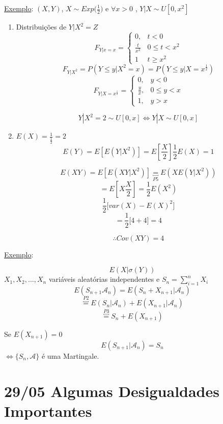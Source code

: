 \documentclass[a4paper,12pt]{article}
\begin{document}
\newpage 


\underline{Exemplo}:
$(X,Y)$,  $X\sim Exp\bigg(\frac{1}{2}\bigg)$ e $\forall x>0$ , $Y|X \sim U[0,x^2]$  

\begin{enumerate}[label=\alph*)]
	\item Distribuições de $Y|X^2=Z$
	$$ 
	F_{Y|x=x}=\begin{cases}
	0, & t<0\\
	\frac{t}{x^2} & 0\le t < x^2\\
	1 & t\ge x^2
	\end{cases}
	$$
	$$F_{Y|X^2} = P(Y\le y| X^2=x)=P(Y\le y|X=x^\frac{1}{2})$$
	$$F_{Y|X=x^\frac{1}{2}}= \begin{cases}
	0, & y<0\\
	\frac{y}{x}, & 0\le y < x\\
	1, & y>x
	\end{cases}
	 $$
	
	 $$Y|X^2=2 \sim  U[0,x] \Leftrightarrow Y|X \sim U[0,x]$$


\item $E(X) = \frac{1}{\frac{1}{2}}=2$
$$E(Y) = E[E(Y|X^2)] = E[\frac{X}{2}] \frac{1}{2}E(X)=1$$

$$E(XY)= E[E(XY|X^2)] \underbracket{=}_{P5} E(XE(Y|X^2))$$
$$=E[X\frac{X}{2}] = \frac{1}{2}E(X^2) $$
$$\frac{1}{2} \bigg[var(X) - E(X)^2 \bigg] $$
$$=\frac{1}{2}\bigg[4+4\bigg]=4 $$

$$\therefore Cov(XY)=4 $$

\end{enumerate}

\newpage 

\underline{Exemplo}:

$$E(X|\sigma(Y)) $$
$X_1,X_2,\ldots,X_n $  variáveis aleatórias independentes e $S_n = \sum\limits_{i=1}^{n}X_i$
$$E(S_{n+1} \mathscr A_n)  = E(S_n+X_{n+1}|\mathscr A_n) $$
$$\overbracket{=}^{P2} E(S_n|\mathscr A_n) + E(X_{n+1}|\mathscr A_n) $$ 
$$\overbracket{=}^{P3}S_n + E(X_{n+1}) $$

Se $E(X_{n+1})=0$
$$E(S_{n+1}|\mathscr A_n) = S_n $$
$\Leftrightarrow \{ S_n,\mathscr A\} $ é uma Martingale.

\newpage 

\section{29/05 Algumas Desigualdades Importantes}
\end{document}
